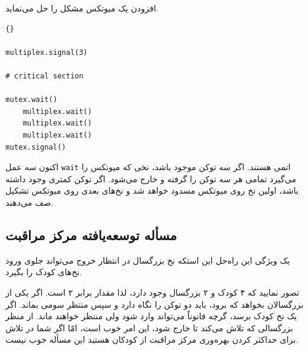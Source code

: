 \documentclass{book}
\begin{document}
    افزودن یک میوتکس مشکل را حل می‌نماید. 

\begin{latin}
\begin{lstlisting}[title=\rl{راه‌حل مرکز مراقبت از کودکان (بزرگسال)}]{}
     
multiplex.signal(3)

# critical section

mutex.wait()
    multiplex.wait()
    multiplex.wait()
    multiplex.wait()
mutex.signal()
\end{lstlisting}
\end{latin}

    اکنون سه عمل {\tt wait} اتمی هستند. اگر سه توکن موجود باشد، نخی که میوتکس را می‌گیرد تمامی هر سه توکن را گرفته و خارج می‌شود. 
    اگر  توکن کمتری وجود داشته باشد، اولین نخ روی میوتکس مسدود خواهد شد و نخ‌های بعدی روی میوتکس تشکیل صف می‌دهند. 

\subsection {مسأله توسعه‌یافته مرکز مراقبت}

    یک ویژگی این راه‌حل این استکه نخ بزرگسال در انتظار خروج می‌تواند جلوی ورود نخ‌های کودک را بگیرد. 

    تصور نمایید که ۴ کودک و ۲ بزرگسال وجود دارد، لذا مقدار  برابر ۲ است. اگر یکی از بزرگسالان بخواهد که برود، باید دو توکن 
    را نگاه دارد و سپس منتظر سومی بماند. اگر یک نخ کودک برسد، گرچه قانوناً می‌تواند وارد شود ولی منتظر خواهند ماند. 
    از منظر بزرگسالی که تلاش می‌کند تا خارج شود، این امر خوب است، امّا اگر شما در تلاش برای حداکثر کردن بهره‌وری مرکز مراقبت از کودکان هستید 
    این مسأله خوب نیست. 
\end{document}
